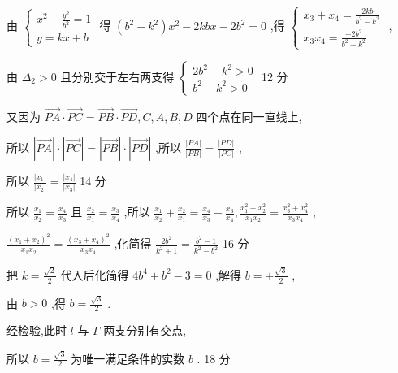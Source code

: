 \documentclass[10pt]{article}
\begin{document}
由 \(\left\{  \begin{array}{l} {x}^{2} - \frac{{y}^{2}}{{b}^{2}} = 1 \\  y = {kx} + b \end{array}\right.\) 得 \(\left( {{b}^{2} - {k}^{2}}\right) {x}^{2} - {2kbx} - 2{b}^{2} = 0\) ,得 \(\left\{  \begin{array}{l} {x}_{3} + {x}_{4} = \frac{2kb}{{b}^{2} - {k}^{2}} \\  {x}_{3}{x}_{4} = \frac{-2{b}^{2}}{{b}^{2} - {k}^{2}} \end{array}\right.\) ,

由 \({\Delta }_{2} > 0\) 且分别交于左右两支得 \(\left\{  \begin{array}{l} 2{b}^{2} - {k}^{2} > 0 \\  {b}^{2} - {k}^{2} > 0 \end{array}\right.\) 12 分

又因为 \(\overrightarrow{PA} \cdot  \overrightarrow{PC} = \overrightarrow{PB} \cdot  \overrightarrow{PD},C,A,B,D\) 四个点在同一直线上,

所以 \(\left| \overrightarrow{PA}\right|  \cdot  \left| \overrightarrow{PC}\right|  = \left| \overrightarrow{PB}\right|  \cdot  \left| \overrightarrow{PD}\right|\) ,所以 \(\frac{\left| PA\right| }{\left| PB\right| } = \frac{\left| PD\right| }{\left| PC\right| }\) ,

所以 \(\frac{\left| {x}_{1}\right| }{\left| {x}_{2}\right| } = \frac{\left| {x}_{4}\right| }{\left| {x}_{3}\right| }\) 14 分

所以 \(\frac{{x}_{1}}{{x}_{2}} = \frac{{x}_{4}}{{x}_{3}}\) 且 \(\frac{{x}_{2}}{{x}_{1}} = \frac{{x}_{3}}{{x}_{4}}\) ,所以 \(\frac{{x}_{1}}{{x}_{2}} + \frac{{x}_{2}}{{x}_{1}} = \frac{{x}_{4}}{{x}_{3}} + \frac{{x}_{3}}{{x}_{4}},\frac{{x}_{1}^{2} + {x}_{2}^{2}}{{x}_{1}{x}_{2}} = \frac{{x}_{3}^{2} + {x}_{4}^{2}}{{x}_{3}{x}_{4}}\) ,

\(\frac{{\left( {x}_{1} + {x}_{2}\right) }^{2}}{{x}_{1}{x}_{2}} = \frac{{\left( {x}_{3} + {x}_{4}\right) }^{2}}{{x}_{3}{x}_{4}}\) ,化简得 \(\frac{2{b}^{2}}{{k}^{2} + 1} = \frac{{b}^{2} - 1}{{k}^{2} - {b}^{2}}\) 16 分

把 \(k = \frac{\sqrt{2}}{2}\) 代入后化简得 \(4{b}^{4} + {b}^{2} - 3 = 0\) ,解得 \(b =  \pm  \frac{\sqrt{3}}{2}\) ,

由 \(b > 0\) ,得 \(b = \frac{\sqrt{3}}{2}\) .

经检验,此时 \(l\) 与 \(\Gamma\) 两支分别有交点,

所以 \(b = \frac{\sqrt{3}}{2}\) 为唯一满足条件的实数 \(b\) . 18 分
\end{document}

